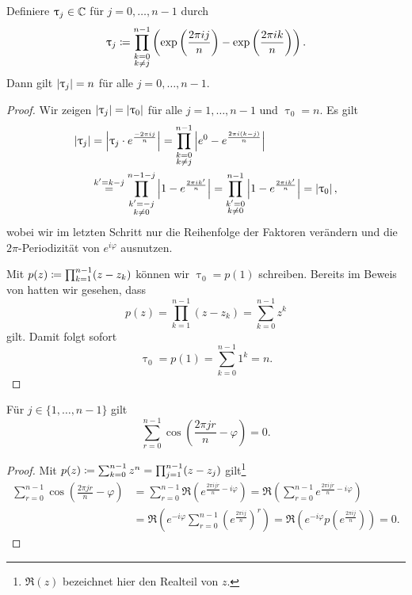 \begin{lemma}
    \label{lemma:uptau_j}
    Definiere $\uptau_j \in \mathbb{C}$ für $j=0, \dots, n-1$ durch
    \[
        \uptau_j \coloneqq \prod_{\substack{k=0\\k\neq j}}^{n-1} \left( \exp\left(\frac{2 \pi i j}{n}\right) - \exp\left(\frac{2 \pi i k}{n}\right) \right).
    \]
    Dann gilt $\left\lvert \uptau_j \right\rvert = n$ für alle $j = 0, \dots, n-1$.
\end{lemma}
\begin{proof}
    Wir zeigen $\left\lvert \uptau_j \right\rvert = \left\lvert \uptau_0 \right\rvert$ für alle $j = 1, \dots, n-1$ und
    $\uptau_0 = n$.
    Es gilt
    \[
        \begin{split}
            \left\lvert \uptau_j \right\rvert
            &= \left\lvert \uptau_j \cdot e^{\frac{- 2\pi i j}{n}} \right\rvert
            = \prod_{\substack{k=0\\ k\neq j}}^{n-1} \left\lvert e^0 - e^{\frac{2 \pi i (k-j)}{n}} \right\rvert\\
            &\overset{k' = k-j}{=}
            \prod_{\substack{k'=-j\\ k\neq 0}}^{n-1-j} \left\lvert 1 - e^{\frac{2 \pi i k'}{n}} \right\rvert
            = \prod_{\substack{k'=0\\ k\neq 0}}^{n-1} \left\lvert 1 - e^{\frac{2 \pi i k'}{n}} \right\rvert
            = \left\lvert \uptau_0 \right\rvert,
        \end{split}
    \]
    wobei wir im letzten Schritt nur die Reihenfolge der Faktoren verändern und
    die $2\pi$-Periodizität von $e^{i \varphi}$ ausnutzen.

    \noindent Mit $p(z) \coloneqq \prod_{k=1}^{n-1} (z - z_k)$ können wir $\uptau_0 = p(1)$
    schreiben.
    Bereits im Beweis von  hatten wir gesehen, dass
    \[
        p(z) = \prod_{k=1}^{n-1} (z-z_k) = \sum_{k=0}^{n-1} z^k
    \]
    gilt.
    Damit folgt sofort
    \[
        \uptau_0 = p(1) = \sum_{k=0}^{n-1} 1^k = n.
    \]
\end{proof}

\begin{lemma}
    \label{lemma:sum_shifted_unit_roots}
    Für $j \in \{1, \dots, n-1\}$ gilt
    \[
        \sum_{r=0}^{n-1} \cos \left( \frac{2 \pi j r}{n} - \varphi \right) = 0.
    \]
\end{lemma}
\begin{proof}
    Mit $p(z) \coloneqq \sum_{k=0}^{n-1} z^n = \prod_{j=1}^{n-1} (z - z_j)$ gilt\footnote{$\Re(z)$ bezeichnet hier den Realteil von $z$.}
    \[
        \begin{split}
            \sum_{r=0}^{n-1} \cos \left( \frac{2 \pi j r}{n} - \varphi \right)
            &= \sum_{r=0}^{n-1} \Re\left( e^{\frac{2 \pi i j r}{n} - i \varphi} \right)
            = \Re \left( \sum_{r=0}^{n-1} e^{\frac{2 \pi i j r}{n} - i \varphi} \right)\\
            &= \Re \left( e^{-i \varphi}\sum_{r=0}^{n-1} \left( e^{\frac{2 \pi i j}{n}}\right)^r \right)
            = \Re \left( e^{-i \varphi} p\left( e^{\frac{2 \pi i j}{n}} \right) \right)
            = 0.
        \end{split}
    \]
\end{proof}

